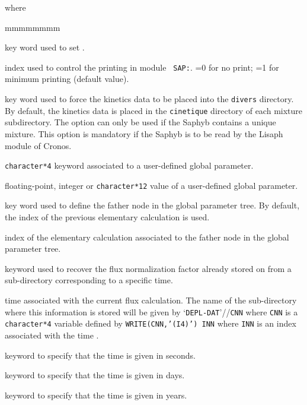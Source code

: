 \goodbreak
\noindent where
\begin{ListeDeDescription}{mmmmmmmm}

\item[\moc{EDIT}] key word used to set .

\item[\dusa{iprint}] index used to control the printing in module {\tt
SAP:}. =0 for no print; =1 for minimum printing (default value).

\item[\moc{CRON}] key word used to force the kinetics data to be placed into the {\tt divers} directory. By default,
the kinetics data is placed in the {\tt cinetique} directory of each mixture subdirectory. The  option can
only be used if the Saphyb contains a unique mixture. This option is mandatory if the Saphyb is to be read by the Lisaph
module of Cronos.

\item[\dusa{parkey}] {\tt character*4} keyword associated to a user-defined global
parameter.

\item[\dusa{value}] floating-point, integer or {\tt character*12} value of a user-defined
global parameter.

\item[\moc{ORIG}] key word used to define the father node in the global parameter tree. By
default, the index of the previous elementary calculation is used.

\item[\dusa{orig}] index of the elementary calculation associated to the father node in the
global parameter tree.

\item[\moc{SET}] keyword used to recover the flux normalization factor already
stored on  from a sub-directory corresponding to a specific time.

\item[\dusa{xtr}] time associated with the current flux calculation. The
name of the sub-directory where this information is stored will be given by
`{\tt DEPL-DAT}'//{\tt CNN} where {\tt CNN} is a  {\tt character*4} variable
defined by  {\tt WRITE(CNN,'(I4)') INN} where {\tt INN} is an index associated
with the time .

\item[\moc{S}] keyword to specify that the time is given in seconds.

\item[\moc{DAY}] keyword to specify that the time is given in days.

\item[\moc{YEAR}] keyword to specify that the time is given in years.

\end{ListeDeDescription}


